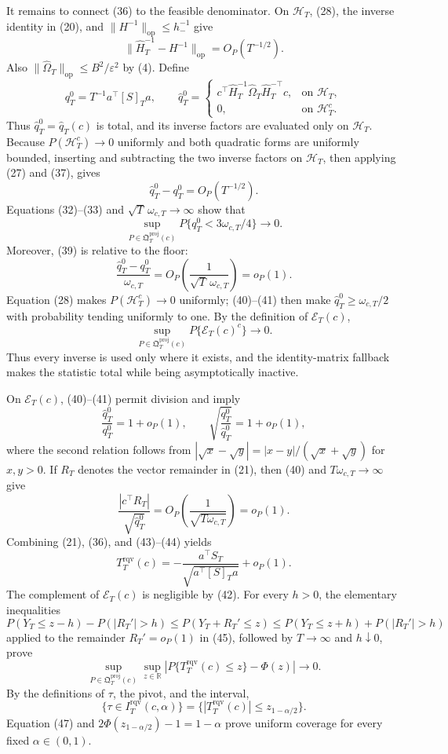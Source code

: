 It remains to connect (36) to the feasible denominator. On \(\mathcal H_T\), (28), the inverse identity in (20), and \(\|H^{-1}\|_{\mathrm{op}}\le h_-^{-1}\) give
\[
 \|\widehat H_T^{-1}-H^{-1}\|_{\mathrm{op}}=O_P(T^{-1/2}).
\tag{37}
\]
Also \(\|\widehat\Omega_T\|_{\mathrm{op}}\le B^2/\varepsilon^2\) by (4). Define
\[
 q_T^0=T^{-1}a^\top[S]_Ta,
 \qquad
 \widehat q_T^0=
 \begin{cases}
 c^\top\widehat H_T^{-1}\widehat\Omega_T\widehat H_T^{-\top}c,
   &\text{on }\mathcal H_T,\\
 0,&\text{on }\mathcal H_T^c.
 \end{cases}
\tag{38}
\]
Thus \(\widehat q_T^0=\widehat q_T(c)\) is total, and its inverse factors are evaluated only on \(\mathcal H_T\). Because \(P(\mathcal H_T^c)\to0\) uniformly and both quadratic forms are uniformly bounded, inserting and subtracting the two inverse factors on \(\mathcal H_T\), then applying (27) and (37), gives
\[
 \widehat q_T^0-q_T^0=O_P(T^{-1/2}).
\tag{39}
\]
Equations (32)--(33) and \(\sqrt T\,\omega_{c,T}\to\infty\) show that
\[
 \sup_{P\in\mathfrak Q_T^{\mathrm{proj}}(c)}
 P\{q_T^0<3\omega_{c,T}/4\}\longrightarrow0.
\tag{40}
\]
Moreover, (39) is relative to the floor:
\[
 \frac{\widehat q_T^0-q_T^0}{\omega_{c,T}}
 =O_P\!\left(\frac{1}{\sqrt T\,\omega_{c,T}}\right)=o_P(1).
\tag{41}
\]
Equation (28) makes \(P(\mathcal H_T^c)\to0\) uniformly; (40)--(41) then make \(\widehat q_T^0\ge\omega_{c,T}/2\) with probability tending uniformly to one. By the definition of \(\mathcal E_T(c)\),
\[
 \sup_{P\in\mathfrak Q_T^{\mathrm{proj}}(c)}P\{\mathcal E_T(c)^c\}
 \longrightarrow0.
\tag{42}
\]
Thus every inverse is used only where it exists, and the identity-matrix fallback makes the statistic total while being asymptotically inactive.

On \(\mathcal E_T(c)\), (40)--(41) permit division and imply
\[
 \frac{\widehat q_T^0}{q_T^0}=1+o_P(1),
 \qquad
 \sqrt{\frac{q_T^0}{\widehat q_T^0}}=1+o_P(1),
\tag{43}
\]
where the second relation follows from \(|\sqrt x-\sqrt y|=|x-y|/(\sqrt x+\sqrt y)\) for \(x,y>0\). If \(R_T\) denotes the vector remainder in (21), then (40) and \(T\omega_{c,T}\to\infty\) give
\[
 \frac{|c^\top R_T|}{\sqrt{\widehat q_T^0}}
 =O_P\!\left(\frac{1}{\sqrt{T\omega_{c,T}}}\right)=o_P(1).
\tag{44}
\]
Combining (21), (36), and (43)--(44) yields
\[
 T_T^{\mathrm{rqv}}(c)
 =-\frac{a^\top S_T}{\sqrt{a^\top[S]_Ta}}+o_P(1).
\tag{45}
\]
The complement of \(\mathcal E_T(c)\) is negligible by (42). For every \(h>0\), the elementary inequalities
\[
 P(Y_T\le z-h)-P(|R_T'|>h)
 \le P(Y_T+R_T'\le z)
 \le P(Y_T\le z+h)+P(|R_T'|>h)
\tag{46}
\]
applied to the remainder \(R_T'=o_P(1)\) in (45), followed by \(T\to\infty\) and \(h\downarrow0\), prove
\[
 \sup_{P\in\mathfrak Q_T^{\mathrm{proj}}(c)}\sup_{z\in\mathbb R}
 \left|P\{T_T^{\mathrm{rqv}}(c)\le z\}-\Phi(z)\right|\longrightarrow0.
\tag{47}
\]
By the definitions of \(\tau\), the pivot, and the interval,
\[
 \{\tau\in I_T^{\mathrm{rqv}}(c,\alpha)\}
 =\{|T_T^{\mathrm{rqv}}(c)|\le z_{1-\alpha/2}\}.
\tag{48}
\]
Equation (47) and \(2\Phi(z_{1-\alpha/2})-1=1-\alpha\) prove uniform coverage for every fixed \(\alpha\in(0,1)\).

